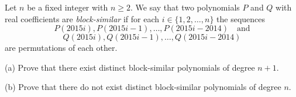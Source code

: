 Let $n$ be a fixed integer with $n \geq 2$. We say that two polynomials $P$ and $Q$ with real coefficients are \emph{block-similar} if for each $i \in \{1, 2, \ldots, n\}$ the sequences
\[
P(2015i), P(2015i - 1), \ldots, P(2015i - 2014) \quad \text{and}
\]
\[
Q(2015i), Q(2015i - 1), \ldots, Q(2015i - 2014)
\]
are permutations of each other.

(a) Prove that there exist distinct block-similar polynomials of degree $n + 1$.

(b) Prove that there do not exist distinct block-similar polynomials of degree $n$.
